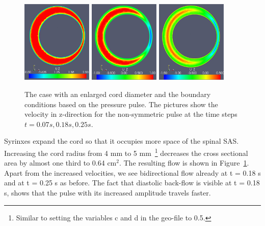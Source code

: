 \begin{figure}\begin{center}
\includegraphics[width=0.3\textwidth]{chapters/hentschel/pdf/pulse_syrinx_f1_08_syrinx05_sysmax_nmb7.pdf}
\includegraphics[width=0.3\textwidth]{chapters/hentschel/pdf/pulse_syrinx_f1_08_syrinx05_sysdia_nmb18.pdf}
\includegraphics[width=0.3\textwidth]{chapters/hentschel/pdf/pulse_syrinx_f1_08_syrinx05_diamin1_nmb25.pdf}
\caption{The case with an enlarged cord diameter and the boundary
    conditions based on the pressure pulse. The pictures show the
    velocity in z-direction for the non-symmetric pulse at the time
    steps $t=0.07s, 0.18s, 0.25s$.}
\label{fig:case4}
\end{center}\end{figure}

Syrinxes expand the cord so that it occupies more space of the spinal
SAS. Increasing the cord radius from 4 mm to 5 mm~\footnote{Similar to
setting the variables c and d in the geo-file to 0.5.} decreases the
cross sectional area by almost one third to 0.64 $\mathrm{cm^2}$. The
resulting flow is shown in Figure~\ref{fig:case4}. Apart from the
increased velocities, we see bidirectional flow already at t = 0.18 s
and at t = 0.25 s as before. The fact that diastolic back-flow is
visible at t = 0.18 s, shows that the pulse with its increased
amplitude travels faster.


